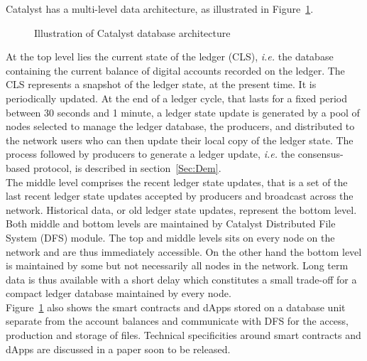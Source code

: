  Catalyst has a multi-level data architecture, as illustrated in Figure~\ref{fig:db}. 

\begin{figure}[H]
\label{fig:db}
\caption{\label{fig:db} Illustration of Catalyst database architecture}
\end{figure}

At the top level lies the current state of the ledger (CLS), \textit{i.e.} the database containing the current balance of digital accounts recorded on the ledger. The CLS represents a snapshot of the ledger state, at the present time. It is periodically updated. At the end of a ledger cycle, that lasts for a fixed period between 30 seconds and 1 minute, a ledger state update is generated by a pool of nodes selected to manage the ledger database, the producers, and distributed to the network users who can then update their local copy of the ledger state. The process followed by producers to generate a ledger update, \textit{i.e.} the consensus-based protocol, is described in section~\ref{Sec:Dem}.\\

The middle level comprises the recent ledger state updates, that is a set of the last recent ledger state updates accepted by producers and broadcast across the network. Historical data, or old ledger state updates, represent the bottom level. Both middle and bottom levels are maintained by Catalyst Distributed File System (DFS) module. The top and middle levels sits on every node on the network and are thus immediately accessible. On the other hand the bottom level is maintained by some but not necessarily all nodes in the network. Long term data is thus available with a short delay which constitutes a small trade-off for a compact ledger database maintained by every node.\\

Figure~\ref{fig:db} also shows the smart contracts and dApps stored on a database unit separate from the account balances and communicate with DFS for the access, production and storage of files. Technical specificities around smart contracts and dApps are discussed in a paper soon to be released.

